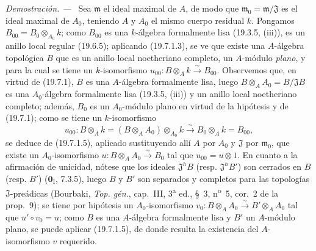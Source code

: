\documentclass[10pt,oneside]{book}
\newcommand{\oldpage}[2][]{%
  \setcounter{footnote}{0}%
  \marginpar{\scriptsize\textbf{#1}~|~#2}\ignorespaces}
\newenvironment{proof}{%
  \par\medskip\noindent\textit{Demostración. ---\ }}{\par}
\begin{document}
\oldpage[0\textsubscript{IV-1}]{109}

\begin{proof}
Sea $\mathfrak m$ el ideal maximal de $A$, de modo que
$\mathfrak m_0=\mathfrak m/\mathfrak J$ es el ideal maximal de $A_0$, teniendo $A$ y
$A_0$ el mismo cuerpo residual $k$. Pongamos
$B_{00}=B_0\otimes_{A_0}k$; como $B_{00}$ es una $k$-álgebra formalmente
lisa (19.3.5, (iii)), es un anillo local regular (19.6.5); aplicando
(19.7.1.3), se ve que existe una $A$-álgebra topológica $B$ que es un
anillo local noetheriano completo, un $A$-módulo \emph{plano}, y para la cual se tiene un
$k$-isomorfismo
$u_{00}:B\otimes_A k\xrightarrow{\sim}B_{00}$. Observemos que, en virtud de (19.7.1),
$B$ es una $A$-álgebra formalmente lisa, luego
$B\otimes_A A_0=B/\mathfrak JB$ es una $A_0$-álgebra formalmente lisa
(19.3.5, (iii)) y un anillo local noetheriano completo; además, $B_0$ es un
$A_0$-módulo plano en virtud de la hipótesis y de (19.7.1); como se tiene un
$k$-isomorfismo
\[
  u_{00}:B\otimes_A k=(B\otimes_A A_0)\otimes_{A_0}k
  \xrightarrow{\sim}B_0\otimes_A k=B_{00},
\]
se deduce de (19.7.1.5), aplicado sustituyendo allí $A$ por $A_0$ y
$\mathfrak J$ por $\mathfrak m_0$, que existe un $A_0$-isomorfismo
$u:B\otimes_A A_0\xrightarrow{\sim}B_0$ tal que $u_{00}=u\otimes1$. En cuanto a
la afirmación de unicidad, nótese que los ideales $\mathfrak J^hB$ (resp.
$\mathfrak J^hB'$) son cerrados en $B$ (resp. $B'$)
($\mathbf 0_{\mathrm I}$, 7.3.5), luego $B$ y $B'$ son separados y completos
para las topologías $\mathfrak J$-preádicas (Bourbaki, \emph{Top. gén.},
cap.~III, 3\textsuperscript{a} ed., §~3, n\textsuperscript{o}~5, cor.~2 de la
prop.~9); se tiene por hipótesis un $A_0$-isomorfismo
$v_0:B\otimes_A A_0\xrightarrow{\sim}B'\otimes_A A_0$ tal que
$u'\circ v_0=u$; como $B$ es una $A$-álgebra formalmente lisa y $B'$ un
$A$-módulo plano, se puede aplicar (19.7.1.5), de donde resulta la existencia del
$A$-isomorfismo $v$ requerido.
\end{proof}
\end{document}

